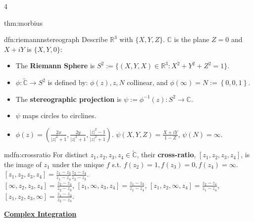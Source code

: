 \documentclass[landscape, 8pt]{extarticle}
\begin{document}
\begin{multicols*}{4}
\begin{thm}{thm:morbius}{ }
		
		
	\end{thm}
	
	
	\begin{dfn}{dfn:riemannnstereograph}{ }
		Describe $\mathbb{R}^3$ with $\{X, Y, Z\}$. $\mathbb{C}$ is the plane $Z = 0$ and $X + iY$ is $\{X, Y, 0\}$:
		\begin{itemize}
			\item The \textbf{Riemann Sphere} is $S^2 := \{(X, Y, X) \in \mathbb{R}^3 : X^2 + Y^2 + Z^2 = 1\}$.
			\item $\phi : \tilde{\mathbb{C}} \to S^2$ is defined by: $\phi(z), z, N$ collinear, and $\phi(\infty) = N := \left\{0, 0, 1\right\}$.
			\item The \textbf{stereographic projection} is $\psi := \phi^{-1}(z): S^2 \to \mathbb{C}$. 
			\item $\psi$ maps circles to circlines.
			\item $\phi(z) = (\frac{2x}{\left|z\right|^2 + 1}, \frac{2y}{\left|z\right|^2 + 1}, \frac{\left|z\right|^2-1}{\left|z\right|^2 + 1})$. $\psi(X, Y, Z) = \frac{X + iY}{1 - Z}$, $\psi(N) = \infty$.
		\end{itemize}
		
		
	\end{dfn}
	
	
	\begin{mdfn}{mdfn:crossratio}{ }
		For distinct $z_1, z_2, z_3, z_4 \in \tilde{\mathbb{C}}$, their \textbf{cross-ratio}, $[z_1, z_2, z_3, z_4]$, is the image of $z_1$ under the unique $f$ s.t. $f(z_2) = 1, f(z_3) = 0, f(z_4) = \infty$.
		$[z_1, z_2, z_3, z_4] = \frac{z_1-z_3}{z_1 - z_4} \frac{z_2 - z_4}{z_2 - z_3}.$ \\
		$[\infty, z_2, z_3, z_4] = \frac{z_2-z_4}{z_2 - z_3}$,
		$[z_1, \infty, z_3, z_4] = \frac{z_1-z_3}{z_1 - z_4}$,
		$[z_1, z_2, \infty, z_4] = \frac{z_2-z_4}{z_1 - z_4}$,
		$[z_1, z_2, z_3, \infty] = \frac{z_1-z_3}{z_2 - z_3}$.
		
	\end{mdfn}
	
	
	
	{\footnotesize \textbf{\underline{Complex Integration}}}
	

\end{multicols*}
\end{document}
